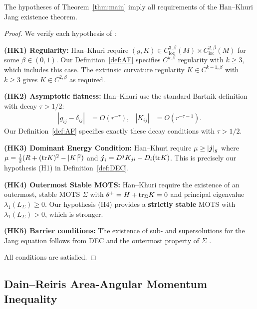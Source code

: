\begin{proposition}\label{prop:hankhuri-compat}
The hypotheses of Theorem~\ref{thm:main} imply all requirements of the Han--Khuri Jang existence theorem.
\end{proposition}

\begin{proof}
We verify each hypothesis of \cite[Theorem~1.1]{hankhuri2013}:

\textbf{(HK1) Regularity:} Han--Khuri require $(g, K) \in C^{3,\beta}_{\mathrm{loc}}(M) \times C^{2,\beta}_{\mathrm{loc}}(M)$ for some $\beta \in (0,1)$. Our Definition~\ref{def:AF} specifies $C^{k,\beta}$ regularity with $k \geq 3$, which includes this case. The extrinsic curvature regularity $K \in C^{k-1,\beta}$ with $k \geq 3$ gives $K \in C^{2,\beta}$ as required.

\textbf{(HK2) Asymptotic flatness:} Han--Khuri use the standard Bartnik definition \cite{bartnik1986} with decay $\tau > 1/2$:
\begin{align*}
|g_{ij} - \delta_{ij}| &= O(r^{-\tau}), & |K_{ij}| &= O(r^{-\tau-1}).
\end{align*}
Our Definition~\ref{def:AF} specifies exactly these decay conditions with $\tau > 1/2$.

\textbf{(HK3) Dominant Energy Condition:} Han--Khuri require $\mu \geq |\boldsymbol{j}|_g$ where $\mu = \frac{1}{2}(R + (\mathrm{tr} K)^2 - |K|^2)$ and $\boldsymbol{j}_i = D^j K_{ji} - D_i(\mathrm{tr} K)$. This is precisely our hypothesis (H1) in Definition~\ref{def:DEC}.

\textbf{(HK4) Outermost Stable MOTS:} Han--Khuri require the existence of an outermost, stable MOTS $\Sigma$ with $\theta^+ = H + \mathrm{tr}_\Sigma K = 0$ and principal eigenvalue $\lambda_1(L_\Sigma) \geq 0$. Our hypothesis (H4) provides a \textbf{strictly stable} MOTS with $\lambda_1(L_\Sigma) > 0$, which is stronger.

\textbf{(HK5) Barrier conditions:} The existence of sub- and supersolutions for the Jang equation follows from DEC and the outermost property of $\Sigma$ \cite[Proposition~4.1]{hankhuri2013}.

All conditions are satisfied. \qedhere
\end{proof}

\subsection{Dain--Reiris Area-Angular Momentum Inequality}

